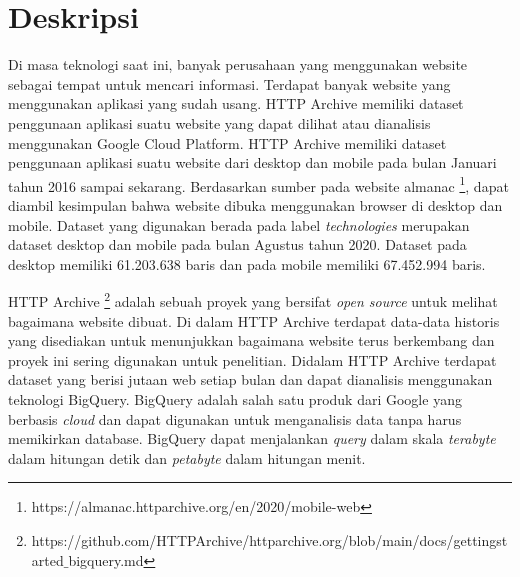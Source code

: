 \documentclass[a4paper,twoside]{article}
\begin{document}
	
	\title{\@judultopik}
	\author{\nama \textendash \@npm} 
	
	\newcommand{\nama}{Vinson Tandra}
	\newcommand{\@npm}{2016730042}
	\newcommand{\@judultopik}{Pengukuran Aplikasi Usang Di HTTP Archive} %
	\newcommand{\jumpemb}{1} %
	\newcommand{\tanggal}{15/10/2021}
	
	
	\maketitle
	
	
	\section{Deskripsi}
	Di masa teknologi saat ini, banyak perusahaan yang menggunakan website sebagai tempat untuk mencari informasi. Terdapat banyak website yang menggunakan aplikasi yang sudah usang. HTTP Archive memiliki dataset penggunaan aplikasi suatu website yang dapat dilihat atau dianalisis menggunakan Google Cloud Platform. HTTP Archive memiliki dataset penggunaan aplikasi suatu website dari desktop dan mobile pada bulan Januari tahun 2016 sampai sekarang. Berdasarkan sumber pada website almanac \footnote{https://almanac.httparchive.org/en/2020/mobile-web}, dapat diambil kesimpulan bahwa website dibuka menggunakan browser di desktop dan mobile. Dataset yang digunakan berada pada label \textit{technologies} merupakan dataset desktop dan mobile pada bulan Agustus tahun 2020. Dataset pada desktop memiliki 61.203.638 baris dan pada mobile memiliki 67.452.994 baris. 
	
	HTTP Archive \footnote{https://github.com/HTTPArchive/httparchive.org/blob/main/docs/gettingstarted$\_$bigquery.md} adalah sebuah proyek yang bersifat \textit{open source} untuk melihat bagaimana website dibuat. Di dalam HTTP Archive terdapat data-data historis yang disediakan untuk menunjukkan bagaimana website terus berkembang dan proyek ini sering digunakan untuk penelitian. Didalam HTTP Archive terdapat dataset yang berisi jutaan web setiap bulan dan dapat dianalisis menggunakan teknologi BigQuery. BigQuery adalah salah satu produk dari Google yang berbasis \textit{cloud} dan dapat digunakan untuk menganalisis data tanpa harus memikirkan database. BigQuery dapat menjalankan \textit{query} dalam skala \textit{terabyte} dalam hitungan detik dan \textit{petabyte} dalam hitungan menit.
	
\end{document}
